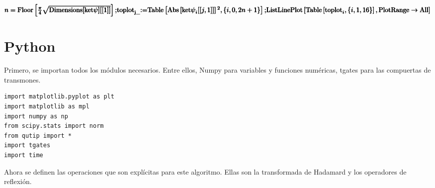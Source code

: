 \begin{doublespace}
\noindent\(\pmb{n=\text{Floor}\left[\frac{\pi }{4}\sqrt{\text{Dimensions}[\text{ket$\psi $}][[1]]}\right];}\\
\pmb{\text{toplot}_{\text{j$\_$}}\text{:=}\text{Table}\left[\text{Abs}\left[\text{ket$\psi $}_i[[j,1]]\right]{}^2,\{i,0,2n+1\}\right];}\\
\pmb{\text{ListLinePlot}\left[\text{Table}\left[\text{toplot}_i,\{i,1,16\}\right],\text{PlotRange}\to \text{All}\right]}\)
\end{doublespace}

%
%
%
%

\section{Python}

Primero, se importan todos los módulos necesarios. Entre ellos, Numpy para variables y funciones numéricas, tgates para las compuertas de transmones.

\begin{verbatim}
import matplotlib.pyplot as plt
import matplotlib as mpl
import numpy as np
from scipy.stats import norm
from qutip import *
import tgates
import time
\end{verbatim}

Ahora se definen las operaciones que son explícitas para este algoritmo. Ellas son la transformada de Hadamard y los operadores de reflexión.

